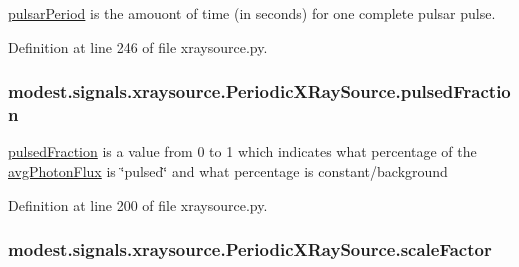 \hyperlink{classmodest_1_1signals_1_1xraysource_1_1PeriodicXRaySource_aeb6d4a8057d3ee58c81e69fb97b9eef7}{pulsar\+Period} is the amouont of time (in seconds) for one complete pulsar pulse. 



Definition at line 246 of file xraysource.\+py.

\subsubsection[{\texorpdfstring{pulsed\+Fraction}{pulsedFraction}}]{\setlength{\rightskip}{0pt plus 5cm}modest.\+signals.\+xraysource.\+Periodic\+X\+Ray\+Source.\+pulsed\+Fraction}\hypertarget{classmodest_1_1signals_1_1xraysource_1_1PeriodicXRaySource_a5f968d9c80e5315d1657eac2ffca4e73}{}\label{classmodest_1_1signals_1_1xraysource_1_1PeriodicXRaySource_a5f968d9c80e5315d1657eac2ffca4e73}


\hyperlink{classmodest_1_1signals_1_1xraysource_1_1PeriodicXRaySource_a5f968d9c80e5315d1657eac2ffca4e73}{pulsed\+Fraction} is a value from 0 to 1 which indicates what percentage of the \hyperlink{classmodest_1_1signals_1_1xraysource_1_1PeriodicXRaySource_ac227ebef6424695360f2771765b4a4a7}{avg\+Photon\+Flux} is \char`\"{}pulsed\char`\"{} and what percentage is constant/background 



Definition at line 200 of file xraysource.\+py.

\subsubsection[{\texorpdfstring{scale\+Factor}{scaleFactor}}]{\setlength{\rightskip}{0pt plus 5cm}modest.\+signals.\+xraysource.\+Periodic\+X\+Ray\+Source.\+scale\+Factor}\hypertarget{classmodest_1_1signals_1_1xraysource_1_1PeriodicXRaySource_a1f4469f0818f93136c6c228bd6fb5a09}{}\label{classmodest_1_1signals_1_1xraysource_1_1PeriodicXRaySource_a1f4469f0818f93136c6c228bd6fb5a09}



